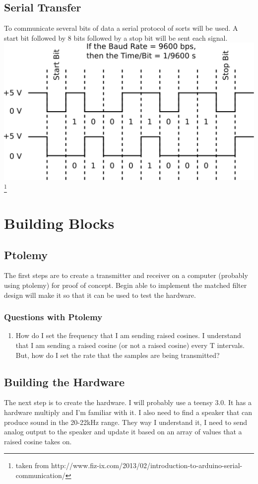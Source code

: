\documentclass[10pt]{article}
\begin{document}
    \subsection{Serial Transfer}
      To communicate several bits of data a serial protocol of sorts will be used. A start bit followed by 8 bits followed by a stop bit will be sent each signal.\\[1em]
        \includegraphics[scale=0.5]{./diagrams/SerialCommunication}\footnote{taken from http://www.fiz-ix.com/2013/02/introduction-to-arduino-serial-communication/}
      
  \section{Building Blocks}
    \subsection{Ptolemy}
      The first steps are to create a transmitter and receiver on a computer (probably using ptolemy) for proof of concept. Begin able to implement the matched filter design will make it so that it can be used to test the hardware.
      \subsubsection{Questions with Ptolemy}
        \begin{enumerate}
          \item How do I set the frequency that I am sending raised cosines. I understand that I am sending a raised cosine (or not a raised cosine) every T intervals. But, how do I set the rate that the samples are being transmitted?
        \end{enumerate}

    \subsection{Building the Hardware}
      The next step is to create the hardware. I will probably use a teensy 3.0. It has a hardware multiply and I'm familiar with it. I also need to find a speaker that can produce sound in the 20-22kHz range. They way I understand it, I need to send analog output to the speaker and update it based on an array of values that a raised cosine takes on.
\end{document}
